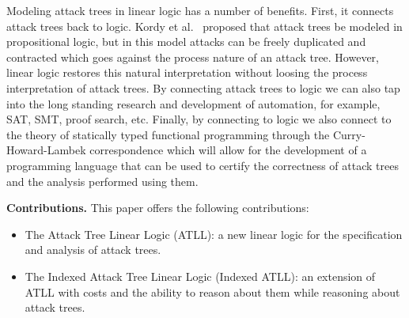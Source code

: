 Modeling attack trees in linear logic has a number of benefits.
First, it connects attack trees back to logic.  Kordy et
al.~\cite{Kordy2010,Kordy:2012} proposed that attack trees be modeled
in propositional logic, but in this model attacks can be freely
duplicated and contracted which goes against the process nature of an
attack tree.  However, linear logic restores this natural
interpretation without loosing the process interpretation of attack
trees.  By connecting attack trees to logic we can also tap into the
long standing research and development of automation, for example,
SAT, SMT, proof search, etc.  Finally, by connecting to logic we also
connect to the theory of statically typed functional programming
through the Curry-Howard-Lambek correspondence which will allow for
the development of a programming language that can be used to certify
the correctness of attack trees and the analysis performed using them.

\textbf{Contributions.}  This paper offers the following
contributions:
\begin{itemize}
\item The Attack Tree Linear Logic (ATLL): a new linear logic for the
  specification and analysis of attack trees.
\item The Indexed Attack Tree Linear Logic (Indexed ATLL): an
  extension of ATLL with costs and the ability to reason about them
  while reasoning about attack trees.
\end{itemize}

